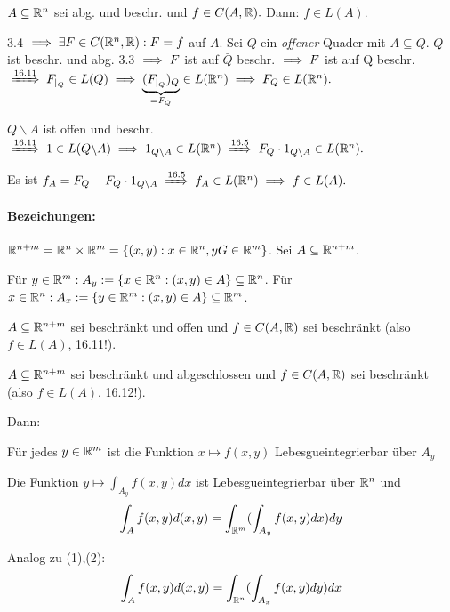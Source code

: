 \documentclass[a4paper,twoside,DIV15,BCOR12mm]{scrbook}
\begin{document}
\begin{satz}
$A\subseteq\mathbb{R}^n$ sei abg. und beschr. und $f\in C(A,\mathbb{R}).$ Dann: $f\in L(A).$
\end{satz}

\begin{beweis}
3.4 $\implies \exists F\in C(\mathbb{R}^n,\mathbb{R}): F=f$ auf $A$. Sei $Q$ ein \emph{offener} Quader mit $A\subseteq Q$. $\bar Q$ ist beschr. und abg. 3.3 $\implies F$ ist auf $\bar Q$ beschr. $\implies F$ ist auf Q beschr. $\folgtnach{16.11} F_{|_Q}\in L(Q) \folgt \underbrace{(F_{|_Q})_Q}_{=F_Q} \in L(\MdR^n) \folgt F_Q \in L(\MdR^n).$

$Q\backslash A$ ist offen und beschr. $\folgtnach{16.11} 1 \in L(Q\backslash A) \folgt 1_{Q\backslash A} \in L(\MdR^n) \folgtnach{16.5} F_Q\cdot1_{Q\backslash A} \in L(\MdR^n).$

Es ist $f_A = F_Q-F_Q\cdot1_{Q\backslash A} \folgtnach{16.5} f_A\in L(\MdR^n) \folgt f\in L(A).$
\end{beweis}
\paragraph{Bezeichungen:} $\mathbb{R}^{n+m} = \mathbb{R}^n\times\mathbb{R}^m = \{ (x,y) : x \in\mathbb{R}^n, y
G
\in\mathbb{R}^m\}$. Sei $A \subseteq \mathbb{R}^{n+m}$.

Für $y \in \mathbb{R}^m: A_y :=\{x\in\mathbb{R}^n:(x,y)\in A\} \subseteq \mathbb{R}^n$.
Für $x \in \mathbb{R}^n: A_x :=\{y\in\mathbb{R}^m:(x,y)\in A\} \subseteq \mathbb{R}^m$.

\begin{satz}

$A\subseteq\mathbb{R}^{n+m}$ sei beschränkt und offen und $f \in C(A,\mathbb{R})$ sei
beschränkt (also $f \in L(A)$, 16.11!).

$A\subseteq\mathbb{R}^{n+m}$ sei beschränkt und abgeschlossen und $f \in C(A,\mathbb{R})$
sei beschränkt (also $f \in L(A)$, 16.12!).

Dann:
\begin{liste}
\item Für jedes $y\in\mathbb{R}^m$ ist die Funktion $x\mapsto f(x,y)$ Lebesgueintegrierbar über $A_y$
\item Die Funktion $y\mapsto \int_{A_y} f(x,y)dx$ ist Lebesgueintegrierbar über $\mathbb{R}^n$ und
\[\int_A f(x,y)d(x,y) = \int_{\mathbb{R}^m} ( \int_{A_y} f(x,y)dx)dy\]
\item Analog zu (1),(2):
\[\int_A f(x,y)d(x,y) = \int_{\mathbb{R}^n} ( \int_{A_x} f(x,y)dy)dx\]
\end{liste}

\end{satz}
\end{document}
